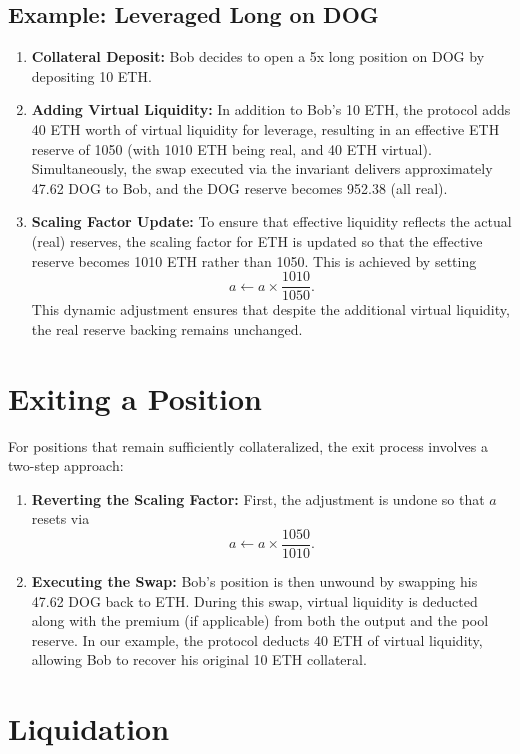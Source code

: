 \documentclass[11pt]{article}
\begin{document}
\subsection{Example: Leveraged Long on DOG}
\begin{enumerate}
    \item \textbf{Collateral Deposit:} Bob decides to open a 5x long position on DOG by depositing 10 ETH.
    \item \textbf{Adding Virtual Liquidity:} In addition to Bob's 10 ETH, the protocol adds 40 ETH worth of virtual liquidity for leverage, resulting in an effective ETH reserve of 1050 (with 1010 ETH being real, and 40 ETH virtual). Simultaneously, the swap executed via the invariant delivers approximately 47.62 DOG to Bob, and the DOG reserve becomes 952.38 (all real).
    \item \textbf{Scaling Factor Update:} To ensure that effective liquidity reflects the actual (real) reserves, the scaling factor for ETH is updated so that the effective reserve becomes 1010 ETH rather than 1050. This is achieved by setting
    \[
    a \leftarrow a \times \frac{1010}{1050}.
    \]
    This dynamic adjustment ensures that despite the additional virtual liquidity, the real reserve backing remains unchanged.
\end{enumerate}

\section{Exiting a Position}

For positions that remain sufficiently collateralized, the exit process involves a two-step approach:
\begin{enumerate}
    \item \textbf{Reverting the Scaling Factor:} First, the adjustment is undone so that \(a\) resets via
    \[
    a \leftarrow a \times \frac{1050}{1010}.
    \]
    \item \textbf{Executing the Swap:} Bob's position is then unwound by swapping his 47.62 DOG back to ETH. During this swap, virtual liquidity is deducted along with the premium (if applicable) from both the output and the pool reserve. In our example, the protocol deducts 40 ETH of virtual liquidity, allowing Bob to recover his original 10 ETH collateral.
\end{enumerate}

\section{Liquidation}
\end{document}
